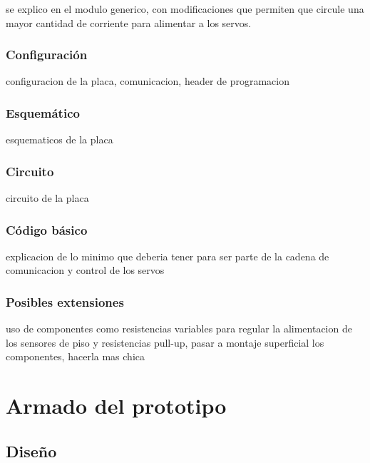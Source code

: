 se explico en el modulo generico, con modificaciones que permiten que circule una mayor cantidad de corriente para alimentar a los servos.

\subsubsection{Configuraci\'on}
\label{h_placas_servos_config}

configuracion de la placa, comunicacion, header de programacion

\subsubsection{Esquem\'atico}
\label{h_placas_servos_esquematico}

esquematicos de la placa

\subsubsection{Circuito}
\label{h_placas_servos_circuito}

circuito de la placa

\subsubsection{C\'odigo b\'asico}
\label{h_placas_servos_codigo}

explicacion de lo minimo que deberia tener para ser parte de la cadena de comunicacion y control de los servos

\subsubsection{Posibles extensiones}
\label{h_placas_servos_extensiones}

uso de componentes como resistencias variables para regular la alimentacion de los sensores de piso y resistencias pull-up, pasar a montaje superficial los componentes, hacerla mas chica

\section{Armado del prototipo}
\label{h_prototipo}

\subsection{Dise\~no}
\label{h_prototipo_diseno}

